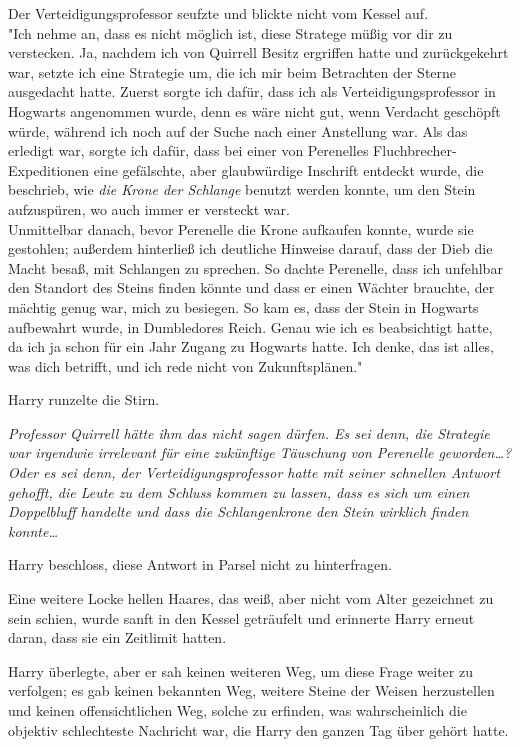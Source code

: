 {Der Verteidigungsprofessor seufzte und blickte nicht vom Kessel auf.\\ "Ich nehme an, dass es nicht möglich ist, diese Stratege müßig vor dir zu verstecken. Ja, nachdem ich von Quirrell Besitz ergriffen hatte und zurückgekehrt war, setzte ich eine Strategie um, die ich mir beim Betrachten der Sterne ausgedacht hatte. Zuerst sorgte ich dafür, dass ich als Verteidigungsprofessor in Hogwarts angenommen wurde, denn es wäre nicht gut, wenn Verdacht geschöpft würde, während ich noch auf der Suche nach einer Anstellung war. Als das erledigt war, sorgte ich dafür, dass bei einer von Perenelles Fluchbrecher-Expeditionen eine gefälschte, aber glaubwürdige Inschrift entdeckt wurde, die beschrieb, wie \emph{die Krone der Schlange} benutzt werden konnte, um den Stein aufzuspüren, wo auch immer er versteckt war.\\ Unmittelbar danach, bevor Perenelle die Krone aufkaufen konnte, wurde sie gestohlen; außerdem hinterließ ich deutliche Hinweise darauf, dass der Dieb die Macht besaß, mit Schlangen zu sprechen. So dachte Perenelle, dass ich unfehlbar den Standort des Steins finden könnte und dass er einen Wächter brauchte, der mächtig genug war, mich zu besiegen. So kam es, dass der Stein in Hogwarts aufbewahrt wurde, in Dumbledores Reich. Genau wie ich es beabsichtigt hatte, da ich ja schon für ein Jahr Zugang zu Hogwarts hatte. Ich denke, das ist alles, was dich betrifft, und ich rede nicht von Zukunftsplänen."

Harry runzelte die Stirn.

\emph{Professor Quirrell hätte ihm das nicht sagen dürfen. Es sei denn, die Strategie war irgendwie irrelevant für eine zukünftige Täuschung von Perenelle geworden…? Oder es sei denn, der Verteidigungsprofessor hatte mit seiner schnellen Antwort gehofft, die Leute zu dem Schluss kommen zu lassen, dass es sich um einen Doppelbluff handelte und dass die Schlangenkrone den Stein wirklich finden konnte…}

Harry beschloss, diese Antwort in Parsel nicht zu hinterfragen.

Eine weitere Locke hellen Haares, das weiß, aber nicht vom Alter gezeichnet zu sein schien, wurde sanft in den Kessel geträufelt und erinnerte Harry erneut daran, dass sie ein Zeitlimit hatten.

Harry überlegte, aber er sah keinen weiteren Weg, um diese Frage weiter zu verfolgen; es gab keinen bekannten Weg, weitere Steine der Weisen herzustellen und keinen offensichtlichen Weg, solche zu erfinden, was wahrscheinlich die objektiv schlechteste Nachricht war, die Harry den ganzen Tag über gehört hatte.

}
